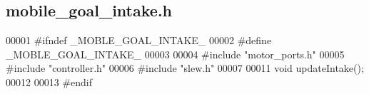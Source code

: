 \subsection{mobile\+\_\+goal\+\_\+intake.\+h}
\label{mobile__goal__intake_8h_source}

\begin{DoxyCode}
00001 \textcolor{preprocessor}{#ifndef \_MOBLE\_GOAL\_INTAKE\_}
00002 \textcolor{preprocessor}{#define  \_MOBLE\_GOAL\_INTAKE\_}
00003 
00004 \textcolor{preprocessor}{#include "motor_ports.h"}
00005 \textcolor{preprocessor}{#include "controller.h"}
00006 \textcolor{preprocessor}{#include "slew.h"}
00007 
00011 \textcolor{keywordtype}{void} updateIntake();
00012 
00013 \textcolor{preprocessor}{#endif}
\end{DoxyCode}
